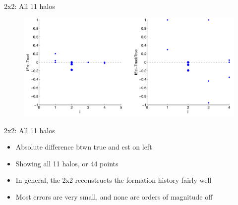 \documentclass{beamer}
\begin{document}
\begin{frame}{2x2: All 11 halos}
	
	\begin{figure}
			\begin{center}
				\includegraphics[scale=0.30]{s4t2m7allpctdiff.pdf}
			\end{center}
	\end{figure}	
	
\end{frame}
\begin{frame}[shrink]{2x2: All 11 halos}
	
	\begin{itemize}
		\item Absolute difference btwn true and est on left
		\item Showing all 11 halos, or 44 points
		\item In general, the 2x2 reconstructs the formation history fairly well
		\item Most errors are very small, and none are orders of magnitude off
	\end{itemize}
	
\end{frame}
\end{document}
